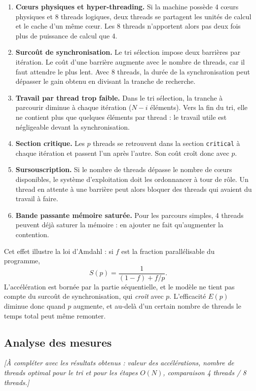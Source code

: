 \documentclass[11pt,a4paper]{article}
\begin{document}
\begin{enumerate}
  \item \textbf{Cœurs physiques et hyper-threading.} Si la machine possède 4 c\oe urs physiques et 8 threads logiques, deux threads se partagent les unités de calcul et le cache d'un même c\oe ur. Les 8 threads n'apportent alors pas deux fois plus de puissance de calcul que 4.
  \item \textbf{Surcoût de synchronisation.} Le tri sélection impose deux barrières par itération. Le coût d'une barrière augmente avec le nombre de threads, car il faut attendre le plus lent. Avec 8 threads, la durée de la synchronisation peut dépasser le gain obtenu en divisant la tranche de recherche.
  \item \textbf{Travail par thread trop faible.} Dans le tri sélection, la tranche à parcourir diminue à chaque itération ($N - i$ éléments). Vers la fin du tri, elle ne contient plus que quelques éléments par thread : le travail utile est négligeable devant la synchronisation.
  \item \textbf{Section critique.} Les $p$ threads se retrouvent dans la section \texttt{critical} à chaque itération et passent l'un après l'autre. Son coût croît donc avec $p$.
  \item \textbf{Sursouscription.} Si le nombre de threads dépasse le nombre de c\oe urs disponibles, le système d'exploitation doit les ordonnancer à tour de rôle. Un thread en attente à une barrière peut alors bloquer des threads qui avaient du travail à faire.
  \item \textbf{Bande passante mémoire saturée.} Pour les parcours simples, 4 threads peuvent déjà saturer la mémoire : en ajouter ne fait qu'augmenter la contention.
\end{enumerate}

Cet effet illustre la loi d'Amdahl : si $f$ est la fraction parallélisable du programme,
\[
S(p) = \frac{1}{(1-f) + f/p}.
\]
L'accélération est bornée par la partie séquentielle, et le modèle ne tient pas compte du surcoût de synchronisation, qui \emph{croît} avec $p$. L'efficacité $E(p)$ diminue donc quand $p$ augmente, et au-delà d'un certain nombre de threads le temps total peut même remonter.

\subsection{Analyse des mesures}

\emph{[À compléter avec les résultats obtenus : valeur des accélérations, nombre de threads optimal pour le tri et pour les étapes $O(N)$, comparaison 4 threads / 8 threads.]}
\end{document}
